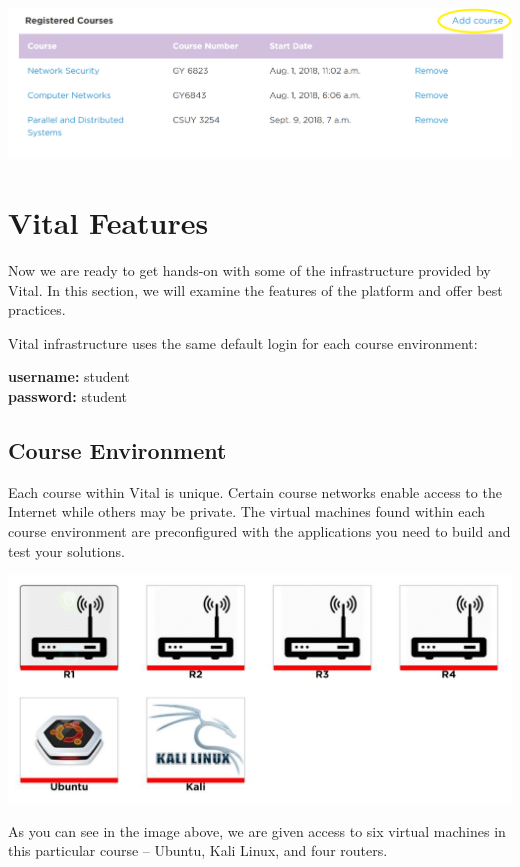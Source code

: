 \documentclass[12pt]{article}
\begin{document}
 
{%
\centering
\includegraphics[width=\linewidth]{course_registration.png}

}

\section*{Vital Features}
Now we are ready to get hands-on with some of the infrastructure provided by Vital. In this section, we will examine the features of the platform and offer best practices. 

Vital infrastructure uses the same default login for each course environment:
\begin{adjustwidth}{2.5em}{0pt}
\textbf{username:} student\\
\textbf{password:} student
\end{adjustwidth}

\subsection*{Course Environment}
Each course within Vital is unique. Certain course networks enable access to the Internet while others may be private. The virtual machines found within each course environment are preconfigured with the applications you need to build and test your solutions.

\includegraphics[scale=0.50]{course_environment}

As you can see in the image above, we are given access to six virtual machines in this particular course – Ubuntu, Kali Linux, and four routers. 
\end{document}
